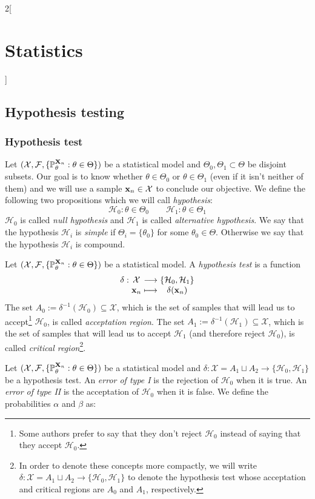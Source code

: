 \documentclass[../../../main_math.tex]{subfiles}
\begin{document}
\begin{multicols}{2}[\section{Statistics}]
  \subsection{Hypothesis testing}
  \subsubsection{Hypothesis test}
  \begin{definition}
    Let $(\mathcal{X},\mathcal{F},\{\mathbb{P}_\theta^{\boldsymbol{\mathrm{X}}_n}:\theta\in\Theta\})$ be a statistical model and $\Theta_0,\Theta_1\subset\Theta$ be disjoint subsets. Our goal is to know whether $\theta\in\Theta_0$ or $\theta\in\Theta_1$ (even if it isn't neither of them) and we will use a sample $\boldsymbol{\mathrm{x}}_n\in\mathcal{X}$ to conclude our objective. We define the following two propositions which we will call \emph{hypothesis}:
    $$\mathcal{H}_0:\theta\in\Theta_0\qquad\mathcal{H}_1:\theta\in\Theta_1$$
    $\mathcal{H}_0$ is called \emph{null hypothesis} and $\mathcal{H}_1$ is called \emph{alternative hypothesis}. We say that the hypothesis $\mathcal{H}_i$ is \emph{simple} if $\Theta_i=\{\theta_0\}$ for some $\theta_0\in\Theta$. Otherwise we say that the hypothesis $\mathcal{H}_i$ is compound.
  \end{definition}
  \begin{definition}
    Let $(\mathcal{X},\mathcal{F},\{\mathbb{P}_\theta^{\boldsymbol{\mathrm{X}}_n}:\theta\in\Theta\})$ be a statistical model. A \emph{hypothesis test} is a function $$\function{\delta}{\mathcal{X}}{\{\mathcal{H}_0,\mathcal{H}_1\}}{\vf{x}_n}{\delta(\vf{x}_n)}$$
    The set $A_0:=\delta^{-1}(\mathcal{H}_0)\subseteq \mathcal{X}$, which is the set of samples that will lead us to accept\footnote{Some authors prefer to say that they don't reject $\mathcal{H}_0$ instead of saying that they accept $\mathcal{H}_0$.} $\mathcal{H}_0$, is called \emph{acceptation region}. The set $A_1:=\delta^{-1}(\mathcal{H}_1)\subseteq \mathcal{X}$, which is the set of samples that will lead us to accept $\mathcal{H}_1$ (and therefore reject $\mathcal{H}_0$), is called \emph{critical region}\footnote{In order to denote these concepts more compactly, we will write $\delta:\mathcal{X}=A_1\sqcup A_2\rightarrow\{\mathcal{H}_0,\mathcal{H}_1\}$ to denote the hypothesis test whose acceptation and critical regions are $A_0$ and $A_1$, respectively.}.
  \end{definition}
  \begin{definition}
    Let $(\mathcal{X},\mathcal{F},\{\mathbb{P}_\theta^{\boldsymbol{\mathrm{X}}_n}:\theta\in\Theta\})$ be a statistical model and $\delta:\mathcal{X}=A_1\sqcup A_2\rightarrow\{\mathcal{H}_0,\mathcal{H}_1\}$ be a hypothesis test. An \emph{error of type I} is the rejection of $\mathcal{H}_0$ when it is true. An \emph{error of type II} is the acceptation of $\mathcal{H}_0$ when it is false. We define the probabilities $\alpha$ and $\beta$ as:

\end{definition}
\end{multicols}
\end{document}
